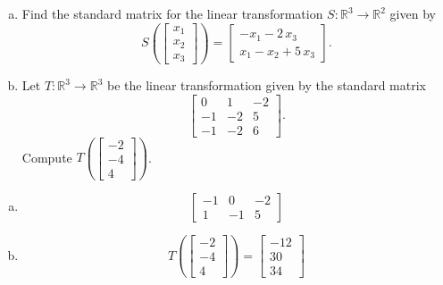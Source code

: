 
\begin{exerciseStatement}

\begin{enumerate}[(a)]
\item Find the standard matrix for the linear transformation \(S:\mathbb{R}^ 3  \to \mathbb{R}^ 2 \) given by \[S\left(  \left[\begin{array}{c}
x_{1} \\
x_{2} \\
x_{3}
\end{array}\right]  \right) =  \left[\begin{array}{c}
-x_{1} - 2 \, x_{3} \\
x_{1} - x_{2} + 5 \, x_{3}
\end{array}\right] .\]
\item Let \(T:\mathbb{R}^ 3  \to \mathbb{R}^ 3 \) be the linear transformation given by the standard matrix \[ \left[\begin{array}{ccc}
0 & 1 & -2 \\
-1 & -2 & 5 \\
-1 & -2 & 6
\end{array}\right] .\] Compute \(T\left( \left[\begin{array}{c}
-2 \\
-4 \\
4
\end{array}\right]  \right)\). 
\end{enumerate}
    
\end{exerciseStatement}
    
\begin{exerciseAnswer} 

\begin{enumerate}[(a)]
\item \[ \left[\begin{array}{ccc}
-1 & 0 & -2 \\
1 & -1 & 5
\end{array}\right] \]
\item \[T\left( \left[\begin{array}{c}
-2 \\
-4 \\
4
\end{array}\right]  \right)= \left[\begin{array}{c}
-12 \\
30 \\
34
\end{array}\right] \]
\end{enumerate}
    
\end{exerciseAnswer}
    
